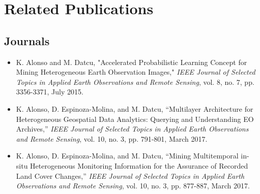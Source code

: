\chapter{Related Publications}
\section{Journals}

\begin{itemize}
\item
K. Alonso and M. Datcu, "Accelerated Probabilistic Learning Concept for Mining Heterogeneous Earth Observation Images," \textit{IEEE Journal of Selected Topics in Applied Earth Observations and Remote Sensing}, vol. 8, no. 7, pp. 3356-3371, July 2015.
\item
K. Alonso, D. Espinoza-Molina, and M. Datcu, “Multilayer Architecture for Heterogeneous Geospatial Data Analytics: Querying and Understanding EO Archives,” \textit{IEEE Journal of Selected
Topics in Applied Earth Observations and Remote Sensing}, vol. 10, no. 3, pp. 791-801, March 2017.

\item
K. Alonso, D. Espinoza-Molina, and M. Datcu, “Mining Multitemporal in-situ Heterogeneous Monitoring Information for the Assurance of Recorded Land Cover Changes,” \textit{IEEE Journal of Selected
Topics in Applied Earth Observations and Remote Sensing}, vol. 10, no. 3, pp. 877-887, March 2017.

\end{itemize}



